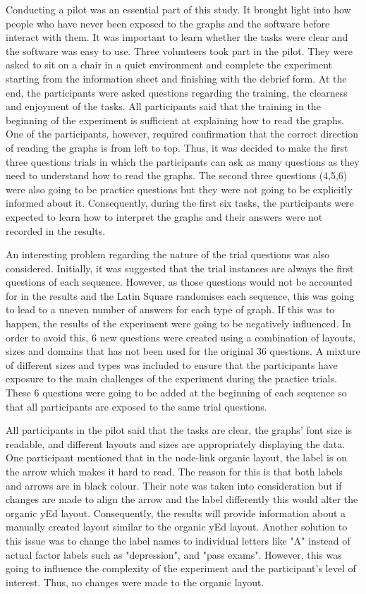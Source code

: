 \documentclass{l4proj}
\begin{document}
Conducting a pilot was an essential part of this study. It brought light into how people who have never been exposed to the graphs and the software before interact with them. It was important to learn whether the tasks were clear and the software was easy to use. Three volunteers took part in the pilot. They were asked to sit on a chair in a quiet environment and complete the experiment starting from the information sheet and finishing with the debrief form. At the end, the participants were asked questions regarding the training, the clearness and enjoyment of the tasks. All participants said that the training in the beginning of the experiment is sufficient at explaining how to read the graphs. One of the participants, however, required confirmation that the correct direction of reading the graphs is from left to top. Thus, it was decided to make the first three questions trials in which the participants can ask as many questions as they need to understand how to read the graphs. The second three questions (4,5,6) were also going to be practice questions but they were not going to be explicitly informed about it. Consequently, during the first six tasks, the participants were expected to learn how to interpret the graphs and their answers were not recorded in the results. 

An interesting problem regarding the nature of the trial questions was also considered. Initially, it was suggested that the trial instances are always the first questions of each sequence. However, as those questions would not be accounted for in the results and the Latin Square randomises each sequence, this was going to lead to a uneven number of answers for each type of graph. If this was to happen, the results of the experiment were going to be negatively influenced. In order to avoid this, 6 new questions were created using a combination of layouts, sizes and domains that has not been used for the original 36 questions. A mixture of different sizes and types was included to ensure that the participants have exposure to the main challenges of the experiment during the practice trials. These 6 questions were going to be added at the beginning of each sequence so that all participants are exposed to the same trial questions.  

All participants in the pilot said that the tasks are clear, the graphs' font size is readable, and different layouts and sizes are appropriately displaying the data. One participant mentioned that in the node-link organic layout, the label is on the arrow which makes it hard to read. The reason for this is that both labels and arrows are in black colour. Their note was taken into consideration but if changes are made to align the arrow and the label differently this would alter the organic yEd layout. Consequently, the results will provide information about a manually created layout similar to the organic yEd layout. Another solution to this issue was to change the label names to individual letters like "A" instead of actual factor labels such as "depression", and "pass exams". However, this was going to influence the complexity of the experiment and the participant's level of interest. Thus, no changes were made to the organic layout.  
\end{document}
